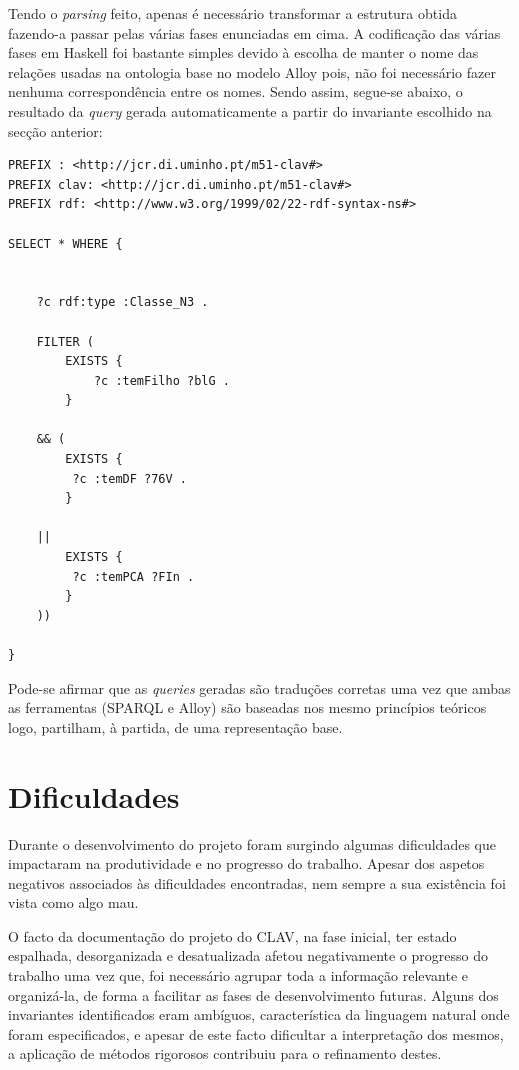 \documentclass[tikz,runningheads,a4paper]{llncs}
\begin{document}
Tendo o \textit{parsing} feito, apenas é necessário transformar a estrutura
obtida fazendo-a passar pelas várias fases enunciadas em cima. A codificação das
várias fases em Haskell foi bastante simples devido à escolha de manter o nome
das relações usadas na ontologia base no modelo Alloy pois, não foi necessário
fazer nenhuma correspondência entre os nomes. Sendo assim, segue-se abaixo, o resultado da 
\textit{query} gerada automaticamente a partir do invariante escolhido na secção
anterior:

\begin{lstlisting}[language=sparql, frame=single, basicstyle=\scriptsize]
PREFIX : <http://jcr.di.uminho.pt/m51-clav#> 
PREFIX clav: <http://jcr.di.uminho.pt/m51-clav#> 
PREFIX rdf: <http://www.w3.org/1999/02/22-rdf-syntax-ns#> 

SELECT * WHERE {


    ?c rdf:type :Classe_N3 . 

    FILTER ( 
        EXISTS { 	
            ?c :temFilho ?blG . 
        } 

    && (
        EXISTS { 	
         ?c :temDF ?76V . 
        } 

    || 
        EXISTS { 	
         ?c :temPCA ?FIn . 
        } 
    ))

}
\end{lstlisting}

Pode-se afirmar que as \textit{queries} geradas são traduções corretas uma vez que ambas as
ferramentas (SPARQL e Alloy) são baseadas nos mesmo princípios teóricos logo,
partilham, à partida, de uma representação base.

\section{Dificuldades}

Durante o desenvolvimento do projeto foram surgindo algumas dificuldades que impactaram na produtividade e no progresso do trabalho. Apesar dos aspetos negativos associados às dificuldades encontradas, nem sempre a sua existência foi vista como algo mau.

O facto da documentação do projeto do CLAV, na fase inicial, ter estado espalhada, desorganizada e desatualizada afetou negativamente o progresso do trabalho uma vez que, foi necessário agrupar toda a informação relevante e organizá-la, de forma a facilitar as fases de desenvolvimento futuras. Alguns dos invariantes identificados eram ambíguos, característica da linguagem natural onde foram especificados, e apesar de este facto dificultar a interpretação dos mesmos, a aplicação de métodos rigorosos contribuiu para o refinamento destes.
\end{document}
